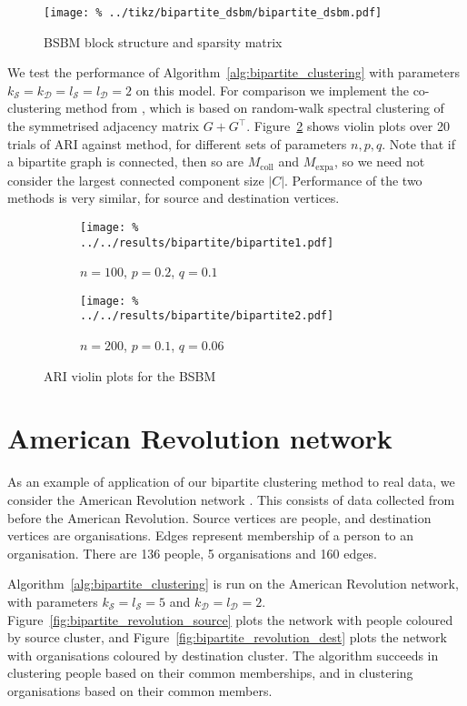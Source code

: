 \documentclass[12pt]{ociamthesis}
\theoremstyle{plain}
\theoremstyle{definition}
\theoremstyle{remark}
\newcommand\ca[1]{\mathcal{#1}}
\begin{document}
\begin{figure}[H]
  \centering
  \texttt{[image: \%
  ../tikz/bipartite\_dsbm/bipartite\_dsbm.pdf]}
  \caption{BSBM block structure and sparsity matrix}
  \label{fig:bipartite_bsbm}
\end{figure}

We test the performance of Algorithm~\ref{alg:bipartite_clustering} with
parameters $k_\ca{S} = k_\ca{D} = l_\ca{S} = l_\ca{D} = 2$ on this model.
For comparison we implement the co-clustering method from \cite{dhillon2001co},
which is based on random-walk spectral clustering of the symmetrised adjacency
matrix $G+G^\top$.
Figure~\ref{fig:bipartite} shows violin plots over 20 trials of ARI against
method, for different sets of parameters $n,p,q$.
Note that if a bipartite graph is connected, then so are $M_\mathrm{coll}$ and
$M_\mathrm{expa}$, so we need not consider the largest connected component size
$|C|$.
Performance of the two methods is very similar, for source and destination
vertices.

\begin{figure}[H]
  \begin{subfigure}{.49\textwidth}
    \centering
    \texttt{[image: \%
    ../../results/bipartite/bipartite1.pdf]}
    \caption{$n=100$, $p=0.2$, $q=0.1$}
  \end{subfigure}
  \begin{subfigure}{.49\textwidth}
    \centering
    \texttt{[image: \%
    ../../results/bipartite/bipartite2.pdf]}
    \caption{$n=200$, $p=0.1$, $q=0.06$}
  \end{subfigure}
  \caption{ARI violin plots for the BSBM}
  \label{fig:bipartite}
\end{figure}

\section{American Revolution network} \label{sec:bipartite_american_revolution}

As an example of application of our bipartite clustering method to real data,
we consider the American Revolution network \cite{konect:brunson_revolution}.
This consists of data collected from before the American Revolution. Source
vertices are people, and destination vertices are organisations. Edges
represent membership of a person to an organisation. There are 136 people, 5
organisations and 160 edges.

Algorithm~\ref{alg:bipartite_clustering} is run on the American Revolution
network, with parameters $k_\ca{S} = l_\ca{S} = 5$ and $k_\ca{D} = l_\ca{D} =
2$. Figure~\ref{fig:bipartite_revolution_source} plots the network with people
coloured by source cluster, and Figure~\ref{fig:bipartite_revolution_dest}
plots the network with organisations coloured by destination cluster. The
algorithm succeeds in clustering people based on their common memberships, and
in clustering organisations based on their common members.
\end{document}

